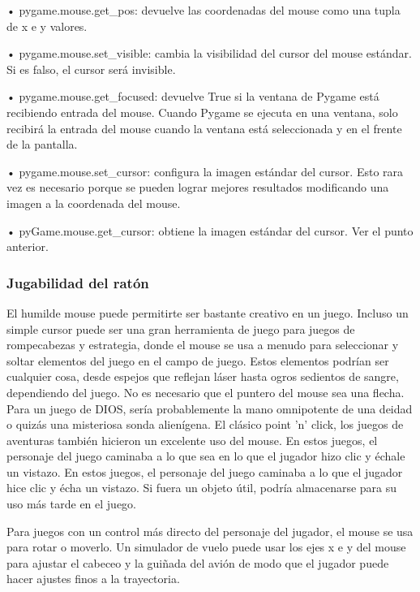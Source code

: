 {• {\ttfamily pygame.mouse.get\_pos}: devuelve las coordenadas del mouse  como una tupla de x e y
valores.

• {\ttfamily pygame.mouse.set\_visible}: cambia la visibilidad del cursor del mouse estándar. Si es falso, el cursor será invisible.


• {\ttfamily pygame.mouse.get\_focused}: devuelve True si la ventana de Pygame está recibiendo entrada del mouse. 
Cuando Pygame se ejecuta en una ventana, solo recibirá la entrada del mouse cuando la ventana está seleccionada y 
en el frente de la pantalla.


• {\ttfamily pygame.mouse.set\_cursor}: configura la imagen estándar del cursor. Esto rara vez es necesario
porque se pueden lograr mejores resultados modificando una imagen a la coordenada del mouse.

• {\ttfamily pyGame.mouse.get\_cursor}: obtiene la imagen  estándar del cursor. Ver el punto anterior.



\subsubsection{Jugabilidad del ratón}

El humilde mouse puede permitirte ser bastante creativo en un juego. Incluso un simple cursor puede ser una gran
herramienta de juego para juegos de rompecabezas y estrategia, donde el mouse se usa a menudo para seleccionar y
soltar elementos del juego en el campo de juego. Estos elementos podrían ser cualquier cosa, 
desde espejos que reflejan láser hasta ogros sedientos de sangre, dependiendo del juego. No es necesario que el puntero 
del mouse sea una flecha. Para un juego de DIOS, sería  probablemente  la mano omnipotente de una deidad o quizás 
una misteriosa sonda alienígena. El clásico point 'n' click, los juegos de aventuras también hicieron un excelente
uso del mouse. En estos juegos, el personaje del juego caminaba a lo que sea en lo que el jugador hizo clic y échale un vistazo. 
En estos juegos, el personaje del juego caminaba a lo que el jugador hice clic y écha un vistazo. Si fuera un objeto útil, 
podría almacenarse para su uso más tarde  en el juego.


Para juegos con un control más directo del personaje del jugador, el mouse se usa para rotar o moverlo. 
Un simulador de vuelo puede  usar los ejes x e y del mouse para ajustar el cabeceo y la guiñada del avión de modo que el jugador
puede hacer ajustes finos a la trayectoria. 


}
